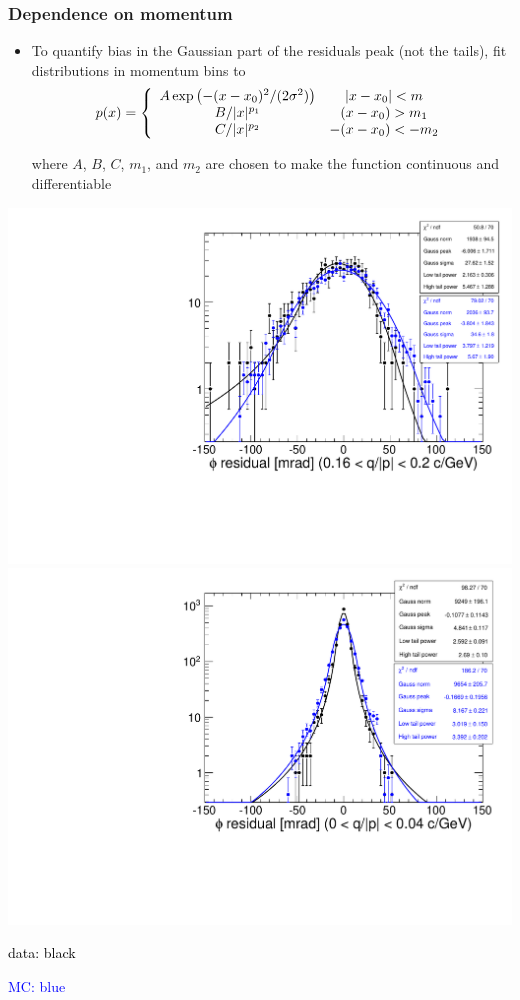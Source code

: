 \documentclass[compress]{beamer}
\begin{document}
\begin{frame}
\frametitle{Dependence on momentum}

\vspace{-1.8 cm}
\begin{itemize}
\item To quantify bias in the Gaussian part of the residuals peak (not
  the tails), fit distributions in momentum bins to
\[ p(x) = \left\{ \begin{array}{c c}
A \exp\left(-(x - x_0)^2/(2\sigma^2)\right) & |x - x_0| < m \\
B/|x|^{p_1} & (x - x_0) > m_1 \\
C/|x|^{p_2} & -(x - x_0) < -m_2 \\
\end{array} \right. \]

where $A$, $B$, $C$, $m_1$, and $m_2$ are chosen to make the function
continuous and differentiable
\end{itemize}

\includegraphics[width=0.49\linewidth]{example_lowmomentum.pdf}
\includegraphics[width=0.49\linewidth]{example_highmomentum.pdf}

\vspace{-3.6 cm}
\hspace{6.3 cm}\textcolor{black}{data: black}

\hspace{6.3 cm}\textcolor{blue}{MC: blue}
\end{frame}
\end{document}
